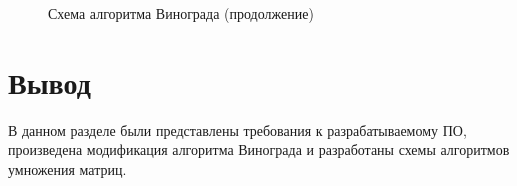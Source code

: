 \begin{figure}
	\caption{Схема алгоритма Винограда (продолжение)}
\end{figure}

\newpage
\section{Вывод}
В данном разделе были представлены требования к разрабатываемому ПО, произведена модификация алгоритма Винограда и разработаны схемы алгоритмов умножения матриц.